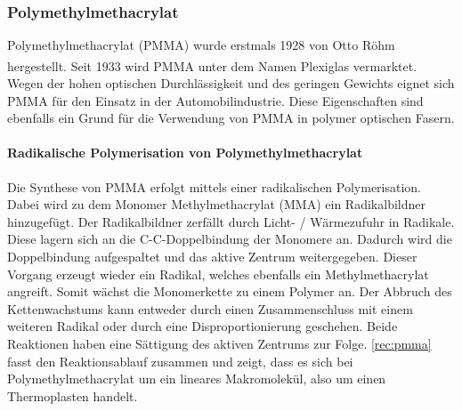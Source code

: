 \subsubsection{Polymethylmethacrylat}
\label{subsec:pofpmma}

Polymethylmethacrylat (PMMA) wurde erstmals 1928 von Otto Röhm hergestellt. Seit
1933 wird PMMA unter dem Namen Plexiglas\textsuperscript{\textregistered}
vermarktet. Wegen der hohen optischen Durchlässigkeit und des geringen Gewichts
eignet sich PMMA für den Einsatz in der Automobilindustrie. Diese Eigenschaften
sind ebenfalls ein Grund für die Verwendung von PMMA in polymer optischen
Fasern. \cite{pofwuppmma}

\paragraph{Radikalische Polymerisation von Polymethylmethacrylat} Die Synthese
von PMMA erfolgt mittels einer radikalischen Polymerisation. Dabei wird zu dem
Monomer Methylmethacrylat (MMA) ein Radikalbildner hinzugefügt. Der
Radikalbildner zerfällt durch Licht- / Wärmezufuhr in Radikale. Diese lagern
sich an die C-C-Doppelbindung der Monomere an. Dadurch wird die Doppelbindung
aufgespaltet und das aktive Zentrum weitergegeben. Dieser Vorgang erzeugt wieder
ein Radikal, welches ebenfalls ein Methylmethacrylat angreift. Somit wächst die
Monomerkette zu einem Polymer an. Der Abbruch des Kettenwachstums kann entweder
durch einen Zusammenschluss mit einem weiteren Radikal oder durch eine
Disproportionierung geschehen. Beide Reaktionen haben eine Sättigung des aktiven
Zentrums zur Folge. \autoref{rec:pmma} fasst den Reaktionsablauf zusammen und
zeigt, dass es sich bei Polymethylmethacrylat um ein lineares Makromolekül, also
um einen Thermoplasten handelt.


